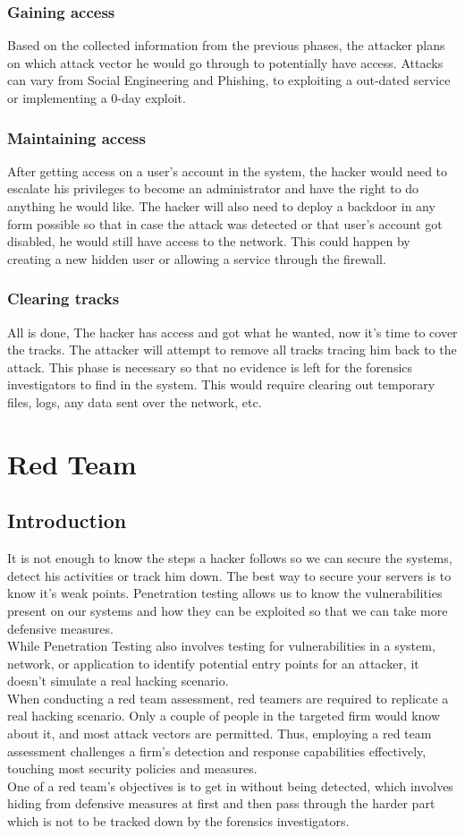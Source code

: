 \subsubsection{Gaining access}
Based on the collected information from the previous phases, the attacker plans on which attack vector he would go through to potentially have access. Attacks can vary from Social Engineering and Phishing, to exploiting a out-dated service or implementing a 0-day exploit.
\subsubsection{Maintaining access}
After getting access on a user's account in the system, the hacker would need to escalate his privileges to become an administrator and have the right to do anything he would like. The hacker will also need to deploy a backdoor in any form possible so that in case the attack was detected or that user's account got disabled, he would still have access to the network. This could happen by creating a new hidden user or allowing a service through the firewall.
\subsubsection{Clearing tracks}
All is done, The hacker has access and got what he wanted, now it's time to cover the tracks. The attacker will attempt to remove all tracks tracing him back to the attack. This phase is necessary so that no evidence is left for the forensics investigators to find in the system. This would require clearing out temporary files, logs, any data sent over the network, etc.

\section{Red Team}
\subsection{Introduction}
It is not enough to know the steps a hacker follows so we can secure the systems, detect his activities or track him down. The best way to secure your servers is to know it's weak points. Penetration testing allows us to know the vulnerabilities present on our systems and how they can be exploited so that we can take more defensive measures.\\
While Penetration Testing also involves testing for vulnerabilities in a system, network, or application to identify potential entry points for an attacker, it doesn't simulate a real hacking scenario.\\
When conducting a red team assessment, red teamers are required to replicate a real hacking scenario. Only a couple of people in the targeted firm would know about it, and most attack vectors are permitted. Thus, employing a red team assessment challenges a firm's detection and response capabilities effectively, touching most security policies and measures.\\
One of a red team's objectives is to get in without being detected, which involves hiding from defensive measures at first and then pass through the harder part which is not to be tracked down by the forensics investigators.
